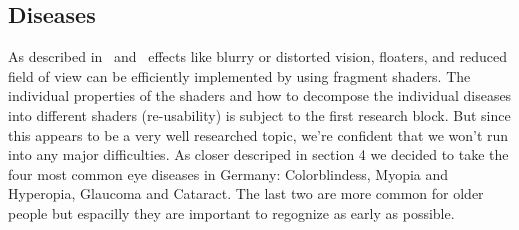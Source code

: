 \documentclass{sig-alternate-05-2015}
\begin{document}
\subsection{Diseases}

As described in \cite{gazedisplays} and \cite{eyediseasesim} effects like
blurry or distorted vision, floaters, and reduced field of view can be
efficiently implemented by using fragment shaders. The individual properties
of the shaders and how to decompose the individual diseases into different
shaders (re-usability) is subject to the first research block. But since this
appears to be a very well researched topic, we're confident that we won't run
into any major difficulties. As closer descriped in section 4 we decided to take the four most common eye diseases in Germany: Colorblindess, Myopia and Hyperopia, Glaucoma and Cataract. The last two are more common for older people but espacilly they are important to regognize as early as possible. 

%
%
%
%
%
%
%
%
\end{document}
